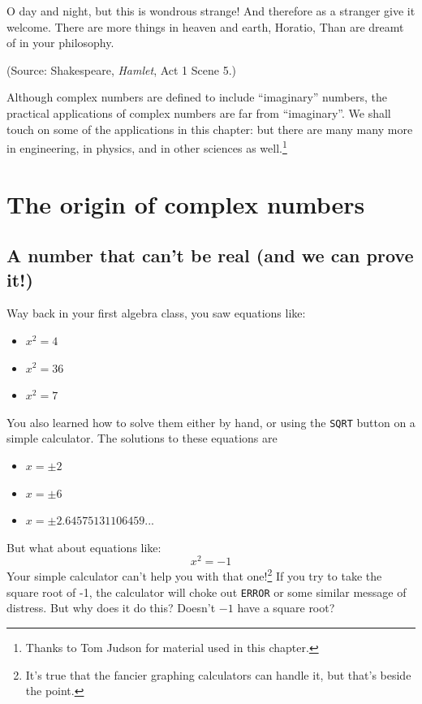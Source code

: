 

\begin{dialogue}
 O day and night, but this is wondrous strange!
 And therefore as a stranger give it welcome.
There are more things in heaven and earth, Horatio,
Than are dreamt of in your philosophy.
\noindent
\end{dialogue}
(Source: Shakespeare, \emph{Hamlet}, Act 1 Scene 5.)
\bigskip

Although complex numbers are defined to include ``imaginary'' numbers, the practical applications of complex numbers are far from ``imaginary''.  We shall touch on some of the applications in this chapter: but there are many many more in engineering, in physics, and in other sciences as well.\footnote{Thanks to Tom Judson for material used in this chapter.}

\section{The origin of complex numbers}\label{origin_complex}

\subsection{A number that can't be real (and we can prove it!)}

Way back in your first algebra class, you saw equations like:
\begin{itemize}
\item $x^2 = 4$
\item $x^2 = 36$
\item $x^2 = 7$

\end{itemize}
You also learned how to solve them either by hand, or using the \texttt{SQRT} button on a simple calculator. The solutions to these equations are
\begin{itemize}
\item $x = \pm 2$
\item $x = \pm 6$
\item $x = \pm 2.64575131106459...$
\end{itemize}
 But what about equations like:
\[x^2 = -1 \]
Your simple calculator can't help you with that one!\footnote{It's true that the fancier graphing calculators can handle it, but that's beside the point.}  If you try to take the square root of -1, the calculator will choke out \texttt{ERROR} or some similar message of distress.  But why does it do this? Doesn't $-1$ have a square root? 

